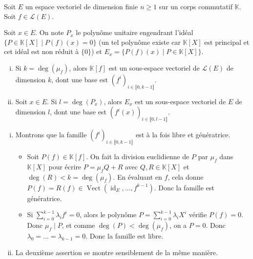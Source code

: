 




	
	Soit $E$ un espace vectoriel de dimension finie $n \geq 1$ sur un corps commutatif $\mathbb{K}$. Soit $f \in \mathcal{L}(E)$.
	
	\begin{notation}
		Soit $x \in E$. On note $P_x$ le polynôme unitaire engendrant l'idéal $\{ P \in \mathbb{K}[X] \mid P(f)(x) = 0 \}$ (un tel polynôme existe car $\mathbb{K}[X]$ est principal et cet idéal est non réduit à $\{ 0 \}$) et $E_x = \{ P(f)(x) \mid P \in \mathbb{K}[X] \}$.
	\end{notation}

	\begin{lemma}
		\label{invariants-de-similitude-1}
		\begin{enumerate}[(i)]
			\item Si $k = \deg(\mu_f)$, alors $\mathbb{K}[f]$ est un sous-espace vectoriel de $\mathcal{L}(E)$ de dimension $k$, dont une base est $(f^i)_{i \in \llbracket 0, k-1 \rrbracket}$.
			\item Soit $x \in E$. Si $l = \deg(P_x)$, alors $E_x$ est un sous-espace vectoriel de $E$ de dimension $l$, dont une base est $(f^i(x))_{i \in \llbracket 0, l-1 \rrbracket}$.
		\end{enumerate}
	\end{lemma}


	\begin{demonstration}
		\begin{enumerate}[(i)]
			\item Montrons que la famille $(f^i)_{i \in \llbracket 0, k-1 \rrbracket}$ est à la fois libre et génératrice.
			\begin{itemize}
				\item Soit $P(f) \in \mathbb{K}[f]$. On fait la division euclidienne de $P$ par $\mu_f$ dans $\mathbb{K}[X]$ pour écrire $P = \mu_f Q + R$ avec $Q, R \in \mathbb{K}[X]$ et $\deg(R) < k = \deg(\mu_f)$. En évaluant en $f$, cela donne $P(f) = R(f) \in \operatorname{Vect}(\operatorname{id}_E, \dots, f^{k-1})$. Donc la famille est génératrice.
				\item Si $\sum_{i=0}^{k-1} \lambda_i f^i = 0$, alors le polynôme $P = \sum_{i=0}^{k-1} \lambda_i X^i$ vérifie $P(f) = 0$. Donc $\mu_f \mid P$, et comme $\deg(P) < \deg(\mu_f)$, on a $P = 0$. Donc $\lambda_0 = \dots = \lambda_{k-1} = 0$. Donc la famille est libre.
			\end{itemize}
			\item La deuxième assertion se montre sensiblement de la même manière.
		\end{enumerate}
	\end{demonstration}

